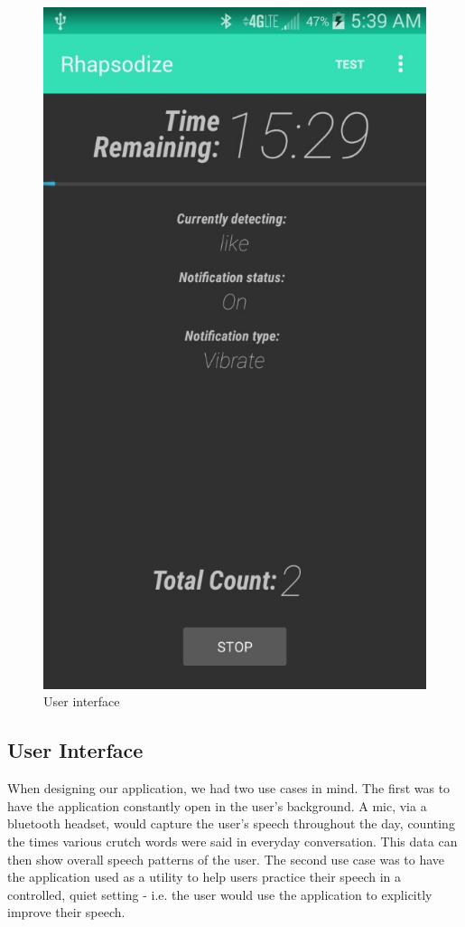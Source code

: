 \documentclass{sigchi}
\begin{document}
\begin{figure}[!h]
\centering
\includegraphics[width=0.9\columnwidth]{ui}
\caption{User interface
}
\label{fig:figure1}
\end{figure}

\subsection{User Interface}

When designing our application, we had two use cases in mind. The first was to have the application constantly open in the user’s background. A mic, via a bluetooth headset, would capture the user’s speech throughout the day, counting the times various crutch words were said in everyday conversation. This data can then show overall speech patterns of the user. The second use case was to have the application used as a utility to help users practice their speech in a controlled, quiet setting - i.e. the user would use the application to explicitly improve their speech. 
\end{document}
